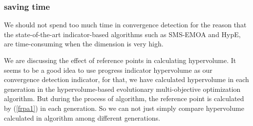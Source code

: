 \documentclass[conference]{IEEEtran}
\begin{document}
\subsubsection{saving time} We should not spend too much time in convergence detection
for the reason that the state-of-the-art indicator-based algorithms such as SMS-EMOA and HypE, 
are time-consuming when the dimension is very high. 

We are discussing the effect of reference points in calculating hypervolume. It seems to be a good
idea to use progress indicator hypervolume as our convergence detection indicator, 
for that, we have calculated 
hypervolume in each generation in the hypervolume-based evolutionary multi-objective optimization algorithm.
But during the process of algorithm, the reference point is calculated by (\ref{frpa1}) 
in each generation.
So we can not just simply compare hypervolume calculated in algorithm among different generations. 
\end{document}
